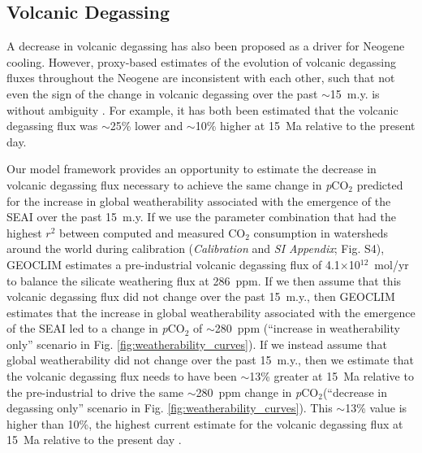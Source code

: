 \documentclass[9pt,twocolumn,twoside,lineno]{pnas-new}
\newcommand{\pCOtwo}{\textit{p}CO$_{2}$\xspace}
\newcommand{\COtwo}{CO$_{2}$\xspace}
\newcommand{\SI}{\textit{SI Appendix}\xspace}
\begin{document}
\subsection*{Volcanic Degassing}

A decrease in volcanic degassing \cite{Berner1983a} has also been proposed as a driver for Neogene cooling. However, proxy-based estimates of the evolution of volcanic degassing fluxes throughout the Neogene are inconsistent with each other, such that not even the sign of the change in volcanic degassing over the past $\sim$15~m.y. is without ambiguity \cite{Godderis2017c}. For example, it has both been estimated that the volcanic degassing flux was $\sim$25\% lower \cite{Cogne2006a} and $\sim$10\% higher \cite{Van-Der-Meer2014a} at 15~Ma relative to the present day.

Our model framework provides an opportunity to estimate the decrease in volcanic degassing flux necessary to achieve the same change in \pCOtwo predicted for the increase in global weatherability associated with the emergence of the SEAI over the past 15~m.y. If we use the parameter combination that had the highest $r^{2}$ between computed and measured \COtwo consumption in watersheds around the world during calibration (\textit{Calibration} and \SI; Fig. S4), GEOCLIM estimates a pre-industrial volcanic degassing flux of 4.1$\times$10$^{12}$~mol/yr to balance the silicate weathering flux at 286~ppm. If we then assume that this volcanic degassing flux did not change over the past 15~m.y., then GEOCLIM estimates that the increase in global weatherability associated with the emergence of the SEAI led to a change in \pCOtwo of $\sim$280~ppm (``increase in weatherability only'' scenario in Fig. \ref{fig:weatherability_curves}). If we instead assume that global weatherability did not change over the past 15~m.y., then we estimate that the volcanic degassing flux needs to have been $\sim$13\% greater at 15~Ma relative to the pre-industrial to drive the same $\sim$280~ppm change in \pCOtwo (``decrease in degassing only'' scenario in Fig. \ref{fig:weatherability_curves}). This $\sim$13\% value is higher than 10\%, the highest current estimate for the volcanic degassing flux at 15~Ma relative to the present day \cite{Van-Der-Meer2014a}.
\end{document}

